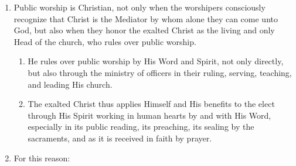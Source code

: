 \documentclass[
]{book}
\providecommand{\tightlist}{%
  \setlength{\itemsep}{0pt}\setlength{\parskip}{0pt}}
\begin{document}
\begin{enumerate}
\def\labelenumi{\arabic{enumi}.}
\tightlist
\item
  \protect\hypertarget{54}{\href{}{}}Public worship is Christian, not only when the worshipers consciously recognize that Christ is the Mediator by whom alone they can come unto God, but also when they honor the exalted Christ as the living and only Head of the church, who rules over public worship.

  \begin{enumerate}
  \def\labelenumii{\alph{enumii}.}
  \tightlist
  \item
    He rules over public worship by His Word and Spirit, not only directly, but also through the ministry of officers in their ruling, serving, teaching, and leading His church.
  \item
    The exalted Christ thus applies Himself and His benefits to the elect through His Spirit working in human hearts by and with His Word, especially in its public reading, its preaching, its sealing by the sacraments, and as it is received in faith by prayer.
  \end{enumerate}
\item
  For this reason:


\end{enumerate}
\end{document}
